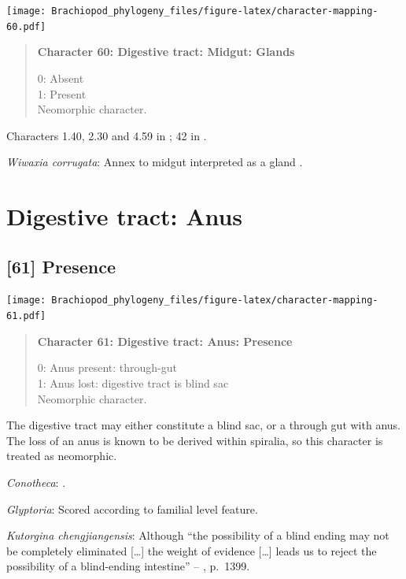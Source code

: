 \documentclass[openany]{book}
\begin{document}
\texttt{[image: Brachiopod\_phylogeny\_files/figure-latex/character-mapping-60.pdf]}

\begin{quote}
\textbf{Character 60: Digestive tract: Midgut: Glands}

0: Absent\\
1: Present\\
Neomorphic character.
\end{quote}

Characters 1.40, 2.30 and 4.59 in \citet{SPS1996}; 42 in
\citet{Haszprunar2000}.

\hypertarget{Wiwaxia_corrugata-coding-60}{}
\emph{Wiwaxia corrugata}: Annex to midgut interpreted as a gland
\citep{Smith2012M}.

\section{Digestive tract: Anus}\label{digestive-tract-anus}

\subsection*{{[}61{]} Presence}\label{presence-3}

\texttt{[image: Brachiopod\_phylogeny\_files/figure-latex/character-mapping-61.pdf]}

\begin{quote}
\textbf{Character 61: Digestive tract: Anus: Presence}

0: Anus present: through-gut\\
1: Anus lost: digestive tract is blind sac\\
Neomorphic character.
\end{quote}

The digestive tract may either constitute a blind sac, or a through gut
with anus. The loss of an anus is known to be derived within spiralia,
so this character is treated as neomorphic.

\hypertarget{Conotheca-coding-61}{}
\emph{Conotheca}: \citep{Devaere2014}.

\hypertarget{Glyptoria-coding-61}{}
\emph{Glyptoria}: Scored according to familial level feature.

\hypertarget{Kutorgina_chengjiangensis-coding-61}{}
\emph{Kutorgina chengjiangensis}: Although ``the possibility of a blind
ending may not be completely eliminated {[}\ldots{}{]} the weight of
evidence {[}\ldots{}{]} leads us to reject the possibility of a
blind-ending intestine'' --
\citet{Zhang2007Rhynchonelliformeanbrachiopods}, p.~1399.
\end{document}
